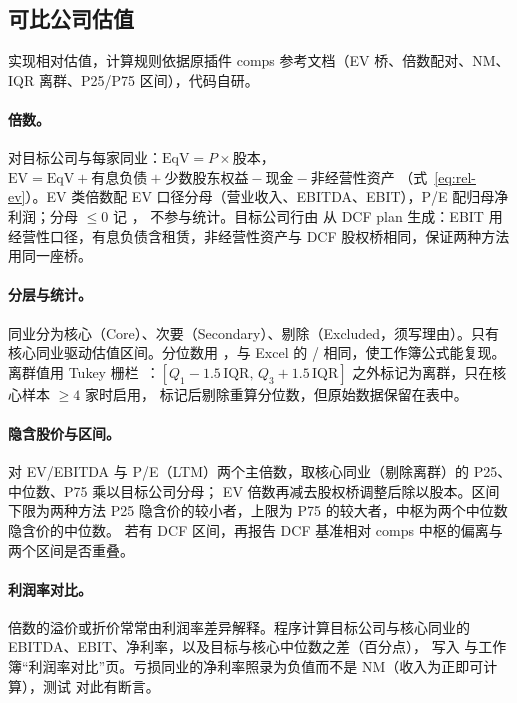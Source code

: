 \subsection{可比公司估值}
\label{sec:val-comps}

 实现相对估值，计算规则依据原插件 comps 参考文档（EV 桥、倍数配对、NM、IQR 离群、P25/P75 区间），代码自研。

\paragraph{倍数。} 对目标公司与每家同业：$\text{EqV}=P\times\text{股本}$，$\text{EV}=\text{EqV}+\text{有息负债}+\text{少数股东权益}-\text{现金}-\text{非经营性资产}$
（式~\eqref{eq:rel-ev}）。EV 类倍数配 EV 口径分母（营业收入、EBITDA、EBIT），P/E 配归母净利润；分母 $\le0$ 记 ，
不参与统计。目标公司行由  从 DCF plan 生成：EBIT 用经营性口径，有息负债含租赁，非经营性资产与 DCF 股权桥相同，保证两种方法用同一座桥。

\paragraph{分层与统计。} 同业分为核心（Core）、次要（Secondary）、剔除（Excluded，须写理由）。只有核心同业驱动估值区间。分位数用
，与 Excel 的 / 相同，使工作簿公式能复现。
离群值用 Tukey 栅栏~\cite{tukey1977eda}：$[Q_1-1.5\,\text{IQR},\,Q_3+1.5\,\text{IQR}]$ 之外标记为离群，只在核心样本 $\ge4$ 家时启用，
标记后剔除重算分位数，但原始数据保留在表中。

\paragraph{隐含股价与区间。} 对 EV/EBITDA 与 P/E（LTM）两个主倍数，取核心同业（剔除离群）的 P25、中位数、P75 乘以目标公司分母；
EV 倍数再减去股权桥调整后除以股本。区间下限为两种方法 P25 隐含价的较小者，上限为 P75 的较大者，中枢为两个中位数隐含价的中位数。
若有 DCF 区间，再报告 DCF 基准相对 comps 中枢的偏离与两个区间是否重叠。

\paragraph{利润率对比。} 倍数的溢价或折价常常由利润率差异解释。程序计算目标公司与核心同业的 EBITDA、EBIT、净利率，以及目标与核心中位数之差（百分点），
写入  与工作簿“利润率对比”页。亏损同业的净利率照录为负值而不是 NM（收入为正即可计算），测试  对此有断言。

